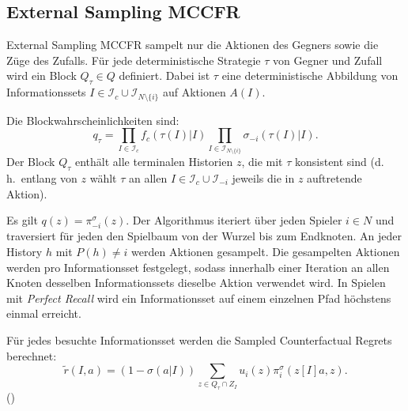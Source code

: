 \subsection{External Sampling MCCFR}
External Sampling MCCFR sampelt nur die Aktionen des Gegners sowie die Züge des Zufalls.
Für jede deterministische Strategie $\tau$ von Gegner und Zufall wird ein Block $Q_\tau \in Q$ definiert.
Dabei ist $\tau$ eine deterministische Abbildung von Informationssets $I \in \mathcal{I}_c \cup \mathcal{I}_{N \setminus \{i\}}$ auf Aktionen $A(I)$.

Die Blockwahrscheinlichkeiten sind:
\begin{equation}
q_\tau = \prod_{I \in \mathcal{I}_c} f_c(\tau(I)|I) \prod_{I \in \mathcal{I}_{N \setminus \{i\}}} \sigma_{-i}(\tau(I)|I).
\end{equation}
Der Block $Q_\tau$ enthält alle terminalen Historien $z$, die mit $\tau$ konsistent sind (d.\,h.\ entlang von $z$ wählt $\tau$ an allen $I \in \mathcal{I}_c \cup \mathcal{I}_{-i}$ jeweils die in $z$ auftretende Aktion).

Es gilt $q(z) = \pi_{-i}^\sigma(z)$.
Der Algorithmus iteriert über jeden Spieler $i \in N$ und traversiert für jeden den Spielbaum von der Wurzel bis zum Endknoten.
An jeder History $h$ mit $P(h) \neq i$ werden Aktionen gesampelt.
Die gesampelten Aktionen werden pro Informationsset festgelegt, sodass innerhalb einer Iteration an allen Knoten desselben Informationssets dieselbe Aktion verwendet wird.
In Spielen mit \emph{Perfect Recall} wird ein Informationsset auf einem einzelnen Pfad höchstens einmal erreicht.

Für jedes besuchte Informationsset werden die Sampled Counterfactual Regrets berechnet:
\begin{equation}
\tilde{r}(I, a) = (1 - \sigma(a|I)) \sum_{z \in Q_\tau \cap Z_I} u_i(z) \pi_i^\sigma(z[I]a, z).
\end{equation}
(\cite[Eq.~11]{lanctot2009monte})

